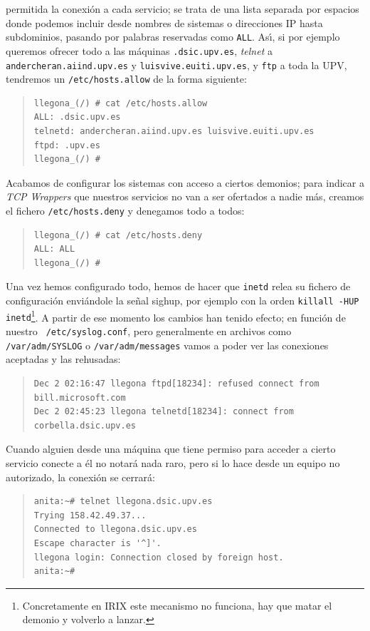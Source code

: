 permitida la conexi\'on a cada servicio; se trata de una lista separada por 
espacios donde podemos incluir desde nombres de sistemas o direcciones IP hasta
subdominios, pasando por palabras reservadas como {\tt ALL}.
As\'{\i}, si por ejemplo queremos ofrecer todo a las
m\'aquinas {\tt .dsic.upv.es}, {\it telnet} a {\tt andercheran.aiind.upv.es} y
{\tt luisvive.euiti.upv.es}, y 
{\tt ftp} a toda la UPV, tendremos un {\tt /etc/hosts.allow} de la forma
siguiente:
\begin{quote}
\begin{verbatim}
llegona_(/) # cat /etc/hosts.allow
ALL: .dsic.upv.es
telnetd: andercheran.aiind.upv.es luisvive.euiti.upv.es
ftpd: .upv.es
llegona_(/) #
\end{verbatim}
\end{quote}
Acabamos de configurar los sistemas con acceso a ciertos demonios; para indicar
a {\it TCP Wrappers} que nuestros servicios no van a ser ofertados a nadie 
m\'as, creamos el fichero {\tt /etc/hosts.deny} y denegamos todo a todos:
\tt
\begin{quote}
\begin{verbatim}
llegona_(/) # cat /etc/hosts.deny
ALL: ALL
llegona_(/) #
\end{verbatim}
\end{quote}
\rm
Una vez hemos configurado todo, hemos de hacer que {\tt inetd} relea su fichero
de configuraci\'on envi\'andole la se\~nal {\sc sighup}, por ejemplo con
la orden {\tt killall -HUP inetd}\footnote{Concretamente en IRIX este mecanismo
no funciona, hay que matar el demonio y volverlo a lanzar.}. A partir de ese 
momento los cambios han tenido efecto; en funci\'on de nuestro {\tt 
/etc/syslog.conf}, pero generalmente en archivos como {\tt /var/adm/SYSLOG} o
{\tt /var/adm/messages} vamos a poder ver las conexiones aceptadas y las
rehusadas:
\tt
\begin{quote}
\begin{verbatim}
Dec 2 02:16:47 llegona ftpd[18234]: refused connect from bill.microsoft.com
Dec 2 02:45:23 llegona telnetd[18234]: connect from corbella.dsic.upv.es
\end{verbatim}
\end{quote}
\rm
Cuando alguien desde una m\'aquina que tiene permiso para acceder a cierto
servicio conecte a \'el no notar\'a nada raro, pero si lo hace desde un equipo
no autorizado, la conexi\'on se cerrar\'a:
\tt
\begin{quote}
\begin{verbatim}
anita:~# telnet llegona.dsic.upv.es
Trying 158.42.49.37...
Connected to llegona.dsic.upv.es
Escape character is '^]'.
llegona login: Connection closed by foreign host.
anita:~# 
\end{verbatim}
\end{quote}
\rm
